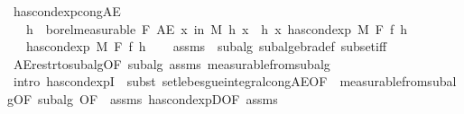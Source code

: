 \begin{isabellebody}
\endisatagproof
{\isafoldproof}%
%
\isadelimproof
\isanewline
%
\endisadelimproof
\isanewline
{}\isamarkupfalse%
\ has{\isacharunderscore}{\kern0pt}cond{\isacharunderscore}{\kern0pt}exp{\isacharunderscore}{\kern0pt}cong{\isacharunderscore}{\kern0pt}AE{\isacharprime}{\kern0pt}{\isacharcolon}{\kern0pt}\isanewline
\ \ \ {\isachardoublequoteopen}h\ {\isasymin}\ borel{\isacharunderscore}{\kern0pt}measurable\ F{\isachardoublequoteclose}\ {\isachardoublequoteopen}AE\ x\ in\ M{\isachardot}{\kern0pt}\ h\ x\ {\isacharequal}{\kern0pt}\ h{\isacharprime}{\kern0pt}\ x{\isachardoublequoteclose}\ {\isachardoublequoteopen}has{\isacharunderscore}{\kern0pt}cond{\isacharunderscore}{\kern0pt}exp\ M\ F\ f\ h{\isacharprime}{\kern0pt}{\isachardoublequoteclose}\isanewline
\ \ \ {\isachardoublequoteopen}has{\isacharunderscore}{\kern0pt}cond{\isacharunderscore}{\kern0pt}exp\ M\ F\ f\ h{\isachardoublequoteclose}\isanewline
%
\isadelimproof
\ \ %
\endisadelimproof
%
\isatagproof
{}\isamarkupfalse%
\ assms{\isacharparenleft}{\kern0pt}{}{\isacharcomma}{\kern0pt}\ {}{\isacharparenright}{\kern0pt}\ subalg\ subalgebra{\isacharunderscore}{\kern0pt}def\ subset{\isacharunderscore}{\kern0pt}iff\isanewline
\ \ \isamarkupfalse%
\ AE{\isacharunderscore}{\kern0pt}restr{\isacharunderscore}{\kern0pt}to{\isacharunderscore}{\kern0pt}subalg{}{\isacharbrackleft}{\kern0pt}OF\ subalg\ assms{\isacharparenleft}{\kern0pt}{}{\isacharparenright}{\kern0pt}{\isacharbrackright}{\kern0pt}\ measurable{\isacharunderscore}{\kern0pt}from{\isacharunderscore}{\kern0pt}subalg\isanewline
\ \ \isamarkupfalse%
\ {\isacharparenleft}{\kern0pt}intro\ has{\isacharunderscore}{\kern0pt}cond{\isacharunderscore}{\kern0pt}expI{\isacharprime}{\kern0pt}\ {\isacharcomma}{\kern0pt}\ subst\ set{\isacharunderscore}{\kern0pt}lebesgue{\isacharunderscore}{\kern0pt}integral{\isacharunderscore}{\kern0pt}cong{\isacharunderscore}{\kern0pt}AE{\isacharbrackleft}{\kern0pt}OF\ {\isacharunderscore}{\kern0pt}\ measurable{\isacharunderscore}{\kern0pt}from{\isacharunderscore}{\kern0pt}subalg{\isacharparenleft}{\kern0pt}{}{\isacharcomma}{\kern0pt}{}{\isacharparenright}{\kern0pt}{\isacharbrackleft}{\kern0pt}OF\ subalg{\isacharbrackright}{\kern0pt}{\isacharcomma}{\kern0pt}\ OF\ {\isacharunderscore}{\kern0pt}\ assms{\isacharparenleft}{\kern0pt}{}{\isacharparenright}{\kern0pt}\ has{\isacharunderscore}{\kern0pt}cond{\isacharunderscore}{\kern0pt}expD{\isacharparenleft}{\kern0pt}{}{\isacharparenright}{\kern0pt}{\isacharbrackleft}{\kern0pt}OF\ assms{\isacharparenleft}{\kern0pt}{}{\isacharparenright}{\kern0pt}{\isacharbrackright}{\kern0pt}{\isacharbrackright}{\kern0pt}{\isacharparenright}{\kern0pt}\isanewline

\end{isabellebody}
